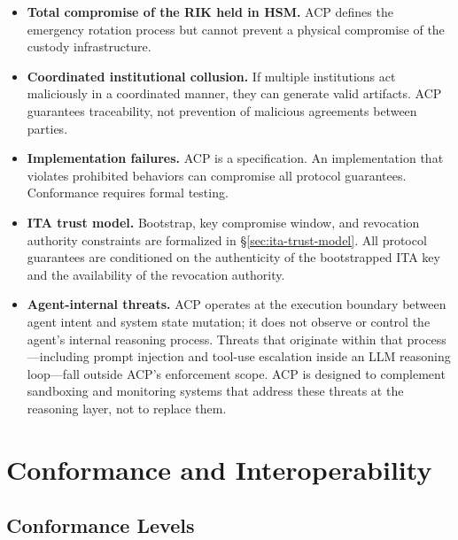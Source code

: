 \documentclass[11pt]{article}
\theoremstyle{definition}
\begin{document}
\begin{itemize}[noitemsep]
  \item \textbf{Total compromise of the RIK held in HSM.}
        ACP defines the emergency rotation process but cannot prevent a physical compromise of the custody infrastructure.
  \item \textbf{Coordinated institutional collusion.}
        If multiple institutions act maliciously in a coordinated manner, they can generate valid artifacts.
        ACP guarantees traceability, not prevention of malicious agreements between parties.
  \item \textbf{Implementation failures.}
        ACP is a specification. An implementation that violates prohibited behaviors can compromise all protocol guarantees.
        Conformance requires formal testing.
  \item \textbf{ITA trust model.}
        Bootstrap, key compromise window, and revocation authority constraints are
        formalized in \S\ref{sec:ita-trust-model}.
        All protocol guarantees are conditioned on the authenticity of the bootstrapped ITA key
        and the availability of the revocation authority.
  \item \textbf{Agent-internal threats.}
        ACP operates at the execution boundary between agent intent and system state mutation;
        it does not observe or control the agent's internal reasoning process.
        Threats that originate within that process---including prompt injection and
        tool-use escalation inside an LLM reasoning loop---fall outside ACP's enforcement scope.
        ACP is designed to complement sandboxing and monitoring systems that address
        these threats at the reasoning layer, not to replace them.
\end{itemize}

\section{Conformance and Interoperability}

\subsection{Conformance Levels}
\end{document}
